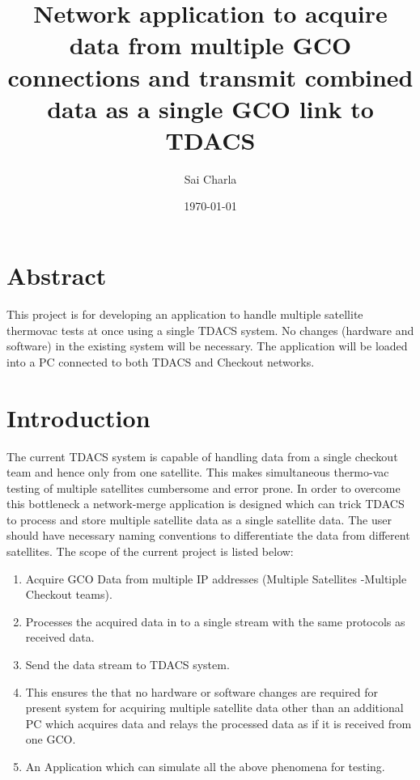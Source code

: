 \documentclass[12pt, a4paper]{report}
\title{Network application to acquire data from multiple GCO connections and
	   transmit combined data as a single GCO link to TDACS}
\author{Sai Charla}
\date{\today}
\begin{document}
\maketitle
\tableofcontents


\chapter*{Abstract}
\par This project is for developing an application to handle multiple satellite
thermovac tests at once using a single TDACS system. No changes (hardware and
software) in the existing system will be necessary. The application will be
loaded into a PC connected to both TDACS and Checkout networks.


\chapter{Introduction}

\par The current TDACS system is capable of handling data from a single
checkout team and hence only from one satellite. This makes simultaneous
thermo-vac testing of multiple satellites cumbersome and error prone. In order
to overcome this bottleneck a network-merge application is designed which can
trick TDACS to process and store multiple satellite data as a single satellite
data. The user should have necessary naming conventions to differentiate the
data from different satellites. The scope of the current project is listed below:

	\begin{enumerate}
			\item Acquire GCO Data from multiple IP addresses (Multiple Satellites
					-Multiple Checkout teams).
			\item Processes the acquired data in to a single stream with the same
					protocols as received data.
			\item Send the data stream to TDACS system.
			\item This ensures the that no hardware or software changes are required
					for present system for acquiring multiple satellite data other than an
					additional PC which acquires data and relays the processed data as if it
					is received from one GCO.
			\item An Application which can simulate all the above phenomena for
					testing.
	\end{enumerate}
\end{document}

